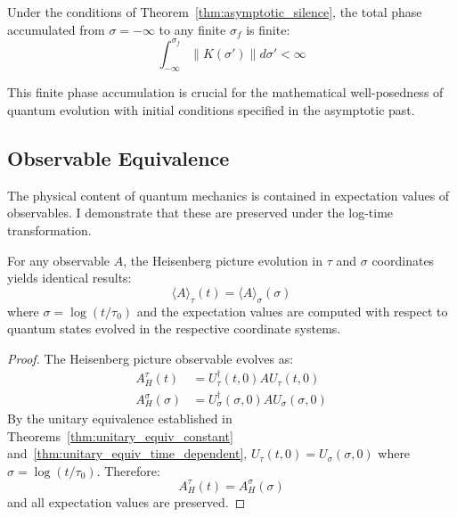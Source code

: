 \begin{corollary}
Under the conditions of Theorem~\ref{thm:asymptotic_silence}, the total phase accumulated from $\sigma = -\infty$ to any finite $\sigma_f$ is finite:
\begin{equation}
\int_{-\infty}^{\sigma_f} \|K(\sigma')\| d\sigma' < \infty
\end{equation}
\end{corollary}

This finite phase accumulation is crucial for the mathematical well-posedness of quantum evolution with initial conditions specified in the asymptotic past.

\subsection{Observable Equivalence}
\label{subsec:observable_equivalence}

The physical content of quantum mechanics is contained in expectation values of observables. I demonstrate that these are preserved under the log-time transformation.

\begin{theorem}
\label{thm:heisenberg_equivalence}
For any observable $A$, the Heisenberg picture evolution in $\tau$ and $\sigma$ coordinates yields identical results:
\begin{equation}
\langle A \rangle_\tau(t) = \langle A \rangle_\sigma(\sigma)
\end{equation}
where $\sigma = \log(t/\tau_0)$ and the expectation values are computed with respect to quantum states evolved in the respective coordinate systems.
\end{theorem}

\begin{proof}
The Heisenberg picture observable evolves as:
\begin{align}
A_H^\tau(t) &= U_\tau^\dagger(t,0) A U_\tau(t,0) \\
A_H^\sigma(\sigma) &= U_\sigma^\dagger(\sigma,0) A U_\sigma(\sigma,0)
\end{align}
By the unitary equivalence established in Theorems~\ref{thm:unitary_equiv_constant} and~\ref{thm:unitary_equiv_time_dependent}, $U_\tau(t,0) = U_\sigma(\sigma,0)$ where $\sigma = \log(t/\tau_0)$. Therefore:
\begin{equation}
A_H^\tau(t) = A_H^\sigma(\sigma)
\end{equation}
and all expectation values are preserved.
\end{proof}

